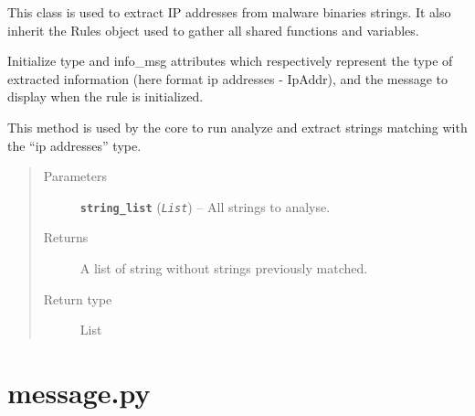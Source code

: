 \documentclass[letterpaper,10pt,oneside]{sphinxmanual}
\begin{document}
\begin{fulllineitems}
\label{index:lib.allRules.ipAddr.IpAddr}
This class is used to extract IP addresses from malware
binaries strings. It also inherit the Rules object used to gather
all shared functions and variables.

\begin{fulllineitems}
\label{index:lib.allRules.ipAddr.IpAddr.__init__}
Initialize type and info\_msg attributes which respectively represent
the type of extracted information (here format ip addresses - IpAddr),
and the message to display when the rule is initialized.

\end{fulllineitems}


\begin{fulllineitems}
\label{index:lib.allRules.ipAddr.IpAddr.run_analysis}
This method is used by the core to run analyze and extract strings
matching with the ``ip addresses'' type.
\begin{quote}\begin{description}
\item[{Parameters}] \leavevmode
\textbf{\texttt{string\_list}} (\emph{\texttt{List}}) -- All strings to analyse.

\item[{Returns}] \leavevmode
A list of string without strings previously matched.

\item[{Return type}] \leavevmode
List

\end{description}\end{quote}

\end{fulllineitems}


\end{fulllineitems}



\section{message.py}
\label{index:message-py}\label{index:module-lib.allRules.message}
\end{document}

